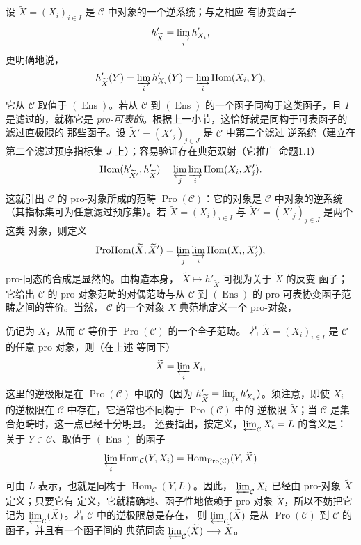 设 $\widetilde X=(X_i)_{i\in I}$ 是 $\mathcal C$ 中对象的一个逆系统；与之相应
有协变函子
\[
  h'_{\widetilde X}=\varinjlim_i h'_{X_i},
\]
更明确地说，
\[
  h'_{\widetilde X}(Y)=\varinjlim_i h'_{X_i}(Y)
  =\varinjlim_i\operatorname{Hom}(X_i,Y),
\]
它从 $\mathcal C$ 取值于 $(\operatorname{Ens})$。若从 $\mathcal C$ 到
$(\operatorname{Ens})$ 的一个函子同构于这类函子，且 $I$ 是滤过的，就称它是
\emph{pro-可表的}。根据上一小节，这恰好就是同构于可表函子的滤过直极限的
那些函子。设 $\widetilde X'=(X'_j)_{j\in J}$ 是 $\mathcal C$ 中第二个滤过
逆系统（建立在第二个滤过预序指标集 $J$ 上）；容易验证存在典范双射（它推广
命题1.1）
\[
  \operatorname{Hom}(h'_{\widetilde X'},h'_{\widetilde X})
  =\varprojlim_j\varinjlim_i\operatorname{Hom}(X_i,X'_j).
\]
这就引出 $\mathcal C$ 的 pro-对象所成的范畴
$\operatorname{Pro}(\mathcal C)$：它的对象是 $\mathcal C$ 中对象的逆系统
（其指标集可为任意滤过预序集）。若
$\widetilde X=(X_i)_{i\in I}$ 与 $\widetilde X'=(X'_j)_{j\in J}$ 是两个这类
对象，则定义
\[
  \operatorname{ProHom}(\widetilde X,\widetilde X')
  =\varprojlim_j\varinjlim_i\operatorname{Hom}(X_i,X'_j),
\]
pro-同态的合成是显然的。由构造本身，
$\widetilde X\longmapsto h'_{\widetilde X}$ 可视为关于 $\widetilde X$ 的反变
函子；它给出 $\mathcal C$ 的 pro-对象范畴的对偶范畴与从 $\mathcal C$ 到
$(\operatorname{Ens})$ 的 pro-可表协变函子范畴之间的等价。当然，
$\mathcal C$ 的一个对象 $X$ 典范地定义一个 pro-对象，

仍记为 $X$，从而 $\mathcal C$ 等价于
$\operatorname{Pro}(\mathcal C)$ 的一个全子范畴。
若 $\widetilde X=(X_i)_{i\in I}$ 是 $\mathcal C$ 的任意 pro-对象，则（在上述
等同下）
\[
  \widetilde X=\varprojlim_i X_i,
\]
这里的逆极限是在 $\operatorname{Pro}(\mathcal C)$ 中取的（因为
$h'_{\widetilde X}=\varinjlim_i h'_{X_i}$）。须注意，即使 $X_i$ 的逆极限在
$\mathcal C$ 中存在，它通常也不同构于 $\operatorname{Pro}(\mathcal C)$ 中的
逆极限 $\widetilde X$；当 $\mathcal C$ 是集合范畴时，这一点已经十分明显。
还要指出，按定义，$\varprojlim_{\mathcal C}X_i=L$ 的含义是：关于
$Y\in\mathcal C$、取值于 $(\operatorname{Ens})$ 的函子
\[
  \varprojlim_i\operatorname{Hom}_{\mathcal C}(Y,X_i)
  =\operatorname{Hom}_{\operatorname{Pro}(\mathcal C)}(Y,\widetilde X)
\]
可由 $L$ 表示，也就是同构于 $\operatorname{Hom}_{\mathcal C}(Y,L)$。因此，
$\varprojlim_{\mathcal C}X_i$ 已经由 pro-对象 $\widetilde X$ 定义；只要它有
定义，它就精确地、函子性地依赖于 pro-对象 $\widetilde X$，所以不妨把它记为
$\varprojlim_{\mathcal C}(\widetilde X)$。若 $\mathcal C$ 中的逆极限总是存在，
则 $\varprojlim_{\mathcal C}(\widetilde X)$ 是从
$\operatorname{Pro}(\mathcal C)$ 到 $\mathcal C$ 的函子，并且有一个函子间的
典范同态
$\varprojlim_{\mathcal C}(\widetilde X)\longrightarrow\widetilde X$。

